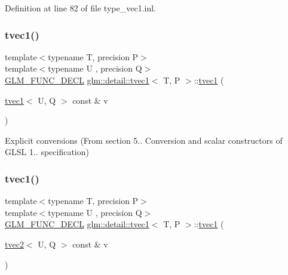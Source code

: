 Definition at line 82 of file type\+\_\+vec1.\+inl.

\mbox{\label{structglm_1_1detail_1_1tvec1_a2dd9171451398b559b398d6c540db4a7}} 
\subsubsection{\texorpdfstring{tvec1()}{tvec1()}\hspace{0.1cm}{\footnotesize\ttfamily [6/14]}}
{\footnotesize\ttfamily template$<$typename T, precision P$>$ \\
template$<$typename U , precision Q$>$ \\
\hyperlink{setup_8hpp_ab2d052de21a70539923e9bcbf6e83a51}{G\+L\+M\+\_\+\+F\+U\+N\+C\+\_\+\+D\+E\+CL} \hyperlink{structglm_1_1detail_1_1tvec1}{glm\+::detail\+::tvec1}$<$ T, P $>$\+::\hyperlink{structglm_1_1detail_1_1tvec1}{tvec1} (\begin{DoxyParamCaption}\item[{\hyperlink{structglm_1_1detail_1_1tvec1}{tvec1}$<$ U, Q $>$ const \&}]{v }\end{DoxyParamCaption})\hspace{0.3cm}{\ttfamily [explicit]}}



Explicit conversions (From section 5.. Conversion and scalar constructors of G\+L\+SL 1.. specification) 

\mbox{\label{structglm_1_1detail_1_1tvec1_a74bfab7db08f995b924a21fbf6e97158}} 
\subsubsection{\texorpdfstring{tvec1()}{tvec1()}\hspace{0.1cm}{\footnotesize\ttfamily [7/14]}}
{\footnotesize\ttfamily template$<$typename T, precision P$>$ \\
template$<$typename U , precision Q$>$ \\
\hyperlink{setup_8hpp_ab2d052de21a70539923e9bcbf6e83a51}{G\+L\+M\+\_\+\+F\+U\+N\+C\+\_\+\+D\+E\+CL} \hyperlink{structglm_1_1detail_1_1tvec1}{glm\+::detail\+::tvec1}$<$ T, P $>$\+::\hyperlink{structglm_1_1detail_1_1tvec1}{tvec1} (\begin{DoxyParamCaption}\item[{\hyperlink{structglm_1_1detail_1_1tvec2}{tvec2}$<$ U, Q $>$ const \&}]{v }\end{DoxyParamCaption})\hspace{0.3cm}{\ttfamily [explicit]}}



